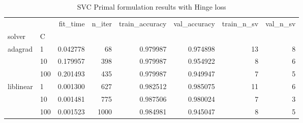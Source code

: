 \begin{table}[H]
\centering
\caption{SVC Primal formulation results with Hinge loss}
\label{primal_svc_hinge_cv_results}
\begin{tabular}{llrrrrrr}
\toprule
          &     &  fit\_time &  n\_iter &  train\_accuracy &  val\_accuracy &  train\_n\_sv &  val\_n\_sv \\
solver & C &           &         &                 &               &             &           \\
\midrule
adagrad & 1   &  0.042778 &      68 &        0.979987 &      0.974898 &          13 &         8 \\
          & 10  &  0.179957 &     398 &        0.979987 &      0.954922 &           8 &         6 \\
          & 100 &  0.201493 &     435 &        0.979987 &      0.949947 &           7 &         5 \\
liblinear & 1   &  0.001300 &     627 &        0.982512 &      0.985075 &          11 &         6 \\
          & 10  &  0.001481 &     775 &        0.987506 &      0.980024 &           7 &         3 \\
          & 100 &  0.001523 &    1000 &        0.984981 &      0.945047 &           8 &         5 \\
\bottomrule
\end{tabular}
\end{table}
